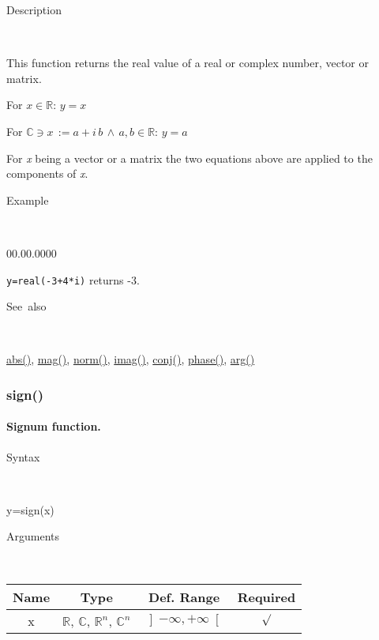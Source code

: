 \begin{description}
\item [Description]~
\end{description}
This function returns the real value of a real or complex number,
vector or matrix.

\medskip{}
For $x\in\mathbb{R}$: $y=x$
\medskip{}

For $\mathbb{\mathbb{C}}\ni x\,:=a+i\, b\,\wedge\, a,b\in\mathbb{R}$:
$y=a$
\medskip{}

For \textit{x} being a vector or a matrix the two equations above
are applied to the components of \textit{x}.

\begin{description}
\item [Example]~
\end{description}
\begin{lyxlist}{00.00.0000}
\item [\texttt{y=real(-3+4{*}i)}]returns -3.
\end{lyxlist}
\begin{description}
\item [See~also]~
\end{description}
\textcolor{blue}{\hyperlink{abs}{abs()}}, \textcolor{blue}{\hyperlink{mag}{mag()}},
\textcolor{blue}{\hyperlink{norm}{norm()}}, \textcolor{blue}{\hyperlink{imag}{imag()}},
\textcolor{blue}{\hyperlink{conj}{conj()}}, \textcolor{blue}{\hyperlink{phase}{phase()}},
\textcolor{blue}{\hyperlink{arg}{arg()}}


\newpage
\subsubsection*{\hypertarget{sign}{}{\Large sign()}}


\paragraph{\label{par:Signum}Signum function.}

\begin{description}
\item [Syntax]~
\end{description}
y=sign(x)

\begin{description}
\item [Arguments]~
\end{description}
\begin{tabular}{|c|c|c|c|}
\hline 
Name&
Type&
Def. Range&
Required\tabularnewline
\hline
\hline 
x&
$\mathbb{R}$, $\mathbb{C}$, $\mathbb{R}^{n}$, $\mathbb{C}^{n}$&
$\left]-\infty,+\infty\right[$&
$\surd$\tabularnewline
\hline
\end{tabular}


